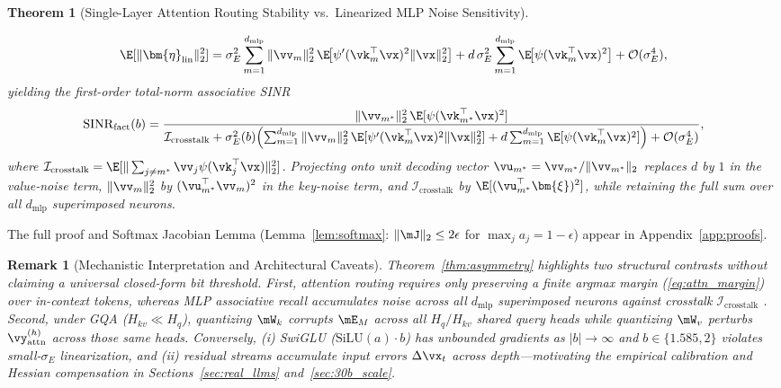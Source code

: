 \documentclass[10pt]{article} %
\renewcommand{\eqref}[1]{(\ref{#1})}
\newtheorem{theorem}{Theorem}
\newtheorem{remark}{Remark}
\begin{document}
\begin{theorem}[Single-Layer Attention Routing Stability vs.\ Linearized MLP Noise Sensitivity]
\begin{enumerate}[leftmargin=*,nosep]
    \begin{equation}
        \E[\|\bm{\eta}_{\text{lin}}\|_2^2]
        = \sigma_E^2 \sum_{m=1}^{d_{\text{mlp}}} \|\vv_m\|_2^2\,\E\!\big[\psi'(\vk_m^\top \vx)^2 \|\vx\|_2^2\big]
        + d\,\sigma_E^2 \sum_{m=1}^{d_{\text{mlp}}} \E\!\big[\psi(\vk_m^\top \vx)^2\big]
        + \mathcal{O}(\sigma_E^4),
        \label{eq:mlp_noise}
    \end{equation}
    yielding the first-order total-norm associative SINR
    \begin{equation}
        \mathrm{SINR}_{\text{fact}}(b)
        = \frac{\|\vv_{m^*}\|_2^2\,\E[\psi(\vk_{m^*}^\top \vx)^2]}{\mathcal{I}_{\text{crosstalk}} + \sigma_E^2(b)\!\left(\sum_{m=1}^{d_{\text{mlp}}} \|\vv_m\|_2^2\,\E[\psi'(\vk_m^\top \vx)^2 \|\vx\|_2^2] + d \sum_{m=1}^{d_{\text{mlp}}}\E[\psi(\vk_m^\top \vx)^2]\right) + \mathcal{O}(\sigma_E^4)},
        \label{eq:mlp_sinr}
    \end{equation}
    where $\mathcal{I}_{\text{crosstalk}} = \E[\|\sum_{j \ne m^*} \vv_j \psi(\vk_j^\top \vx)\|_2^2]$. Projecting onto unit decoding vector $\vu_{m^*} = \vv_{m^*}/\|\vv_{m^*}\|_2$ replaces $d$ by $1$ in the value-noise term, $\|\vv_m\|_2^2$ by $(\vu_{m^*}^\top \vv_m)^2$ in the key-noise term, and $\mathcal{I}_{\text{crosstalk}}$ by $\E[(\vu_{m^*}^\top \bm{\xi})^2]$, while retaining the full sum over all $d_{\text{mlp}}$ superimposed neurons.
\end{enumerate}
\end{theorem}

The full proof and Softmax Jacobian Lemma (Lemma~\ref{lem:softmax}: $\|\mJ\|_2 \le 2\epsilon$ for $\max_j a_j = 1-\epsilon$) appear in Appendix~\ref{app:proofs}.

\begin{remark}[Mechanistic Interpretation and Architectural Caveats]
\label{rem:mechanistic}
Theorem~\ref{thm:asymmetry} highlights two structural contrasts without claiming a universal closed-form bit threshold. First, attention routing requires only preserving a finite argmax margin \eqref{eq:attn_margin} over in-context tokens, whereas MLP associative recall accumulates noise across all $d_{\text{mlp}}$ superimposed neurons against crosstalk $\mathcal{I}_{\text{crosstalk}}$ \citep{elhage2022superposition}. Second, under GQA ($H_{kv} \ll H_q$), quantizing $\mW_k$ corrupts $\mE_M$ across all $H_q / H_{kv}$ shared query heads while quantizing $\mW_v$ perturbs $\vy_{\text{attn}}^{(h)}$ across those same heads. Conversely, (i) SwiGLU ($\mathrm{SiLU}(a)\cdot b$) has unbounded gradients as $|b| \to \infty$ and $b \in \{1.585, 2\}$ violates small-$\sigma_E$ linearization, and (ii) residual streams accumulate input errors $\Delta\vx_t$ across depth---motivating the empirical calibration and Hessian compensation in Sections~\ref{sec:real_llms} and~\ref{sec:30b_scale}.
\end{remark}
\end{document}
